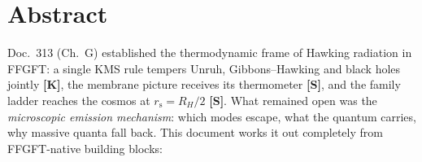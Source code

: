 
\providecommand{\K}{}\renewcommand{\K}{\textbf{[K]}}
\providecommand{\B}{}\renewcommand{\B}{\textbf{[B]}}
\renewcommand{\S}{\textbf{[S]}}
\providecommand{\Q}{}\renewcommand{\Q}{\textbf{[Q]}}
\providecommand{\X}{}\renewcommand{\X}{\textbf{[X]}}
\providecommand{\SETZ}{}\renewcommand{\SETZ}{\textbf{[SETZUNG]}}
\providecommand{\lP}{}\renewcommand{\lP}{\ell_{\mathrm{P}}}
\providecommand{\mP}{}\renewcommand{\mP}{m_{\mathrm{P}}}
\providecommand{\TP}{}\renewcommand{\TP}{T_{\mathrm{P}}}
\renewcommand{\TH}{T_{\mathrm{H}}}
\providecommand{\rs}{}\renewcommand{\rs}{r_{\mathrm{s}}}
\providecommand{\SBH}{}\renewcommand{\SBH}{S_{\mathrm{BH}}}
\providecommand{\Tmass}{}\renewcommand{\Tmass}{\tilde{T}}
\providecommand{\Ebit}{}\renewcommand{\Ebit}{E_{\mathrm{bit}}}

\section*{Abstract}

Doc.\ 313 (Ch.\ G) established the thermodynamic frame of Hawking
radiation in FFGFT: a single KMS rule tempers Unruh, Gibbons--Hawking
and black holes jointly \K, the membrane picture receives its
thermometer \S, and the family ladder reaches the cosmos at
$\rs = R_H/2$ \S. What remained open was the \emph{microscopic
emission mechanism}: which modes escape, what the quantum carries,
why massive quanta fall back. This document works it out completely
from FFGFT-native building blocks:

